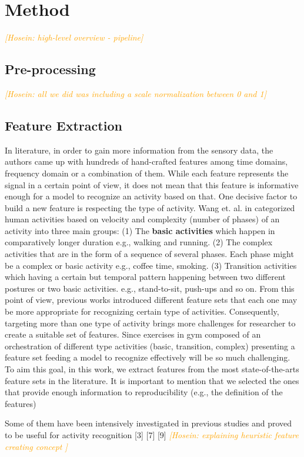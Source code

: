 \documentclass[journal,article,submit,moreauthors,pdftex]{Definitions/mdpi}
\newcommand{\hosein}[1]{\textcolor{orange}{{\it [Hosein: #1]}}}
\begin{document}
\section{Method}
\hosein{high-level overview - pipeline}
\subsection{Pre-processing}
\hosein{all we did was including a scale normalization between 0 and 1}
\subsection{Feature Extraction}
In literature, in order to gain more information from the sensory data, the authors came up with hundreds of hand-crafted features among time domains, frequency domain or a combination of them. While each feature represents the signal in a certain point of view, it does not mean that this feature is informative enough for a model to recognize an activity based on that. One decisive factor to build a new feature is respecting the type of activity. Wang et. al. in \cite{wang2019survey} categorized human activities based on velocity and complexity (number of phases) of an activity into three main groups: (1) The \textbf{basic activities} which happen in comparatively longer duration e.g., walking and running. (2)  The complex activities that are in the form of a sequence of several phases. Each phase might be a complex or basic activity e.g., coffee time, smoking. (3) Transition activities which having a certain but temporal pattern happening between two different postures or two basic activities. e.g., stand-to-sit, push-ups and so on. From this point of view, previous works introduced  different feature sets that each one may be more appropriate for recognizing certain type of activities. Consequently, targeting more than one type of activity brings more challenges for researcher to create a suitable set of features. Since exercises in gym composed of an orchestration of different type activities (basic, transition, complex) presenting a feature set feeding a model to recognize effectively will be so much challenging. To aim this goal, in this work, we extract features from the most state-of-the-arts feature sets in the literature. It is important to mention that we selected the ones that provide enough information to reproducibility (e.g., the definition of the features)


Some of them have been intensively investigated in previous studies and proved to be useful for activity recognition [3] [7] [9]
\hosein{explaining heuristic feature creating concept }
\end{document}
